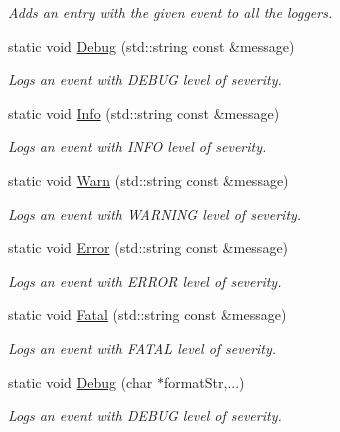 \begin{DoxyCompactItemize}
\begin{DoxyCompactList}\small\item\em Adds an entry with the given event to all the loggers. \end{DoxyCompactList}\item 
static void \hyperlink{class_common_1_1_syslog_aa4836b9e5a008b85f766d1674e9e25f7}{Debug} (std\-::string const \&message)
\begin{DoxyCompactList}\small\item\em Logs an event with D\-E\-B\-U\-G level of severity. \end{DoxyCompactList}\item 
static void \hyperlink{class_common_1_1_syslog_ab152513069a1c082489b52cca7ab17c3}{Info} (std\-::string const \&message)
\begin{DoxyCompactList}\small\item\em Logs an event with I\-N\-F\-O level of severity. \end{DoxyCompactList}\item 
static void \hyperlink{class_common_1_1_syslog_a24abc3e21a6ceabbbc790d17c9582ac6}{Warn} (std\-::string const \&message)
\begin{DoxyCompactList}\small\item\em Logs an event with W\-A\-R\-N\-I\-N\-G level of severity. \end{DoxyCompactList}\item 
static void \hyperlink{class_common_1_1_syslog_a79e7fd2a1db96d16558c897e50c33d8c}{Error} (std\-::string const \&message)
\begin{DoxyCompactList}\small\item\em Logs an event with E\-R\-R\-O\-R level of severity. \end{DoxyCompactList}\item 
static void \hyperlink{class_common_1_1_syslog_a08e318dbae67e74f0762a5c38cdfab73}{Fatal} (std\-::string const \&message)
\begin{DoxyCompactList}\small\item\em Logs an event with F\-A\-T\-A\-L level of severity. \end{DoxyCompactList}\item 
static void \hyperlink{class_common_1_1_syslog_acda09c5d8bc29e1cf252c11f37dfb4b9}{Debug} (char $\ast$format\-Str,...)
\begin{DoxyCompactList}\small\item\em Logs an event with D\-E\-B\-U\-G level of severity. \end{DoxyCompactList}\item 

\end{DoxyCompactItemize}
